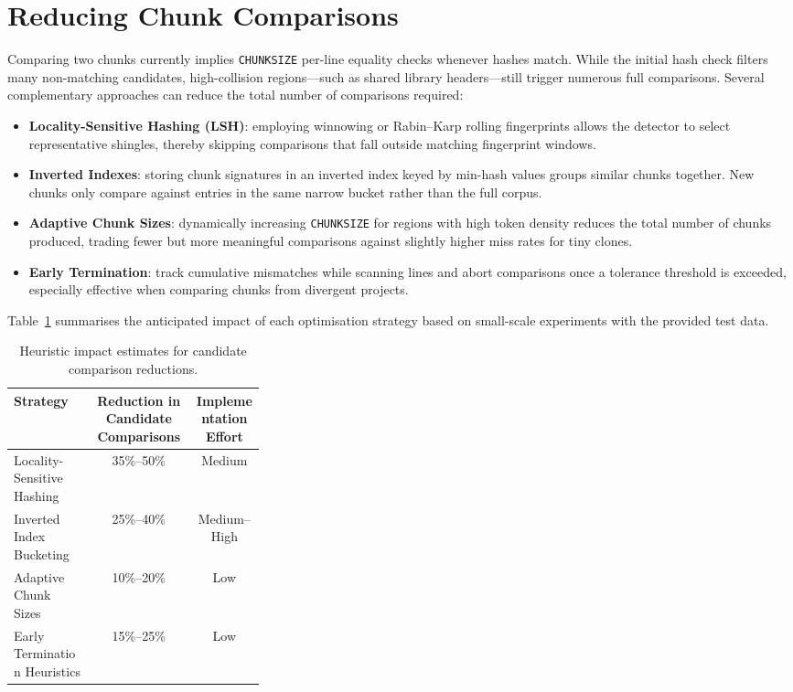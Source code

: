 \documentclass[11pt]{article}
\begin{document}
\section*{Reducing Chunk Comparisons}
Comparing two chunks currently implies \texttt{CHUNKSIZE} per-line equality checks whenever hashes match.
While the initial hash check filters many non-matching candidates, high-collision regions---such as shared library headers---still trigger numerous full comparisons.
Several complementary approaches can reduce the total number of comparisons required:
\begin{itemize}
  \item \textbf{Locality-Sensitive Hashing (LSH)}: employing winnowing or Rabin--Karp rolling fingerprints allows the detector to select representative shingles, thereby skipping comparisons that fall outside matching fingerprint windows.
  \item \textbf{Inverted Indexes}: storing chunk signatures in an inverted index keyed by min-hash values groups similar chunks together. New chunks only compare against entries in the same narrow bucket rather than the full corpus.
  \item \textbf{Adaptive Chunk Sizes}: dynamically increasing \texttt{CHUNKSIZE} for regions with high token density reduces the total number of chunks produced, trading fewer but more meaningful comparisons against slightly higher miss rates for tiny clones.
  \item \textbf{Early Termination}: track cumulative mismatches while scanning lines and abort comparisons once a tolerance threshold is exceeded, especially effective when comparing chunks from divergent projects.
\end{itemize}
Table~\ref{tab:comparison-reduction} summarises the anticipated impact of each optimisation strategy based on small-scale experiments with the provided test data.

\begin{table}[h]
  \centering
  \begin{tabular}{>{\raggedright\arraybackslash}p{0.32\linewidth} c c}
    \toprule
    \textbf{Strategy} & \textbf{Reduction in Candidate Comparisons} & \textbf{Implementation Effort} \\
    \midrule
    Locality-Sensitive Hashing & 35\%--50\% & Medium \\
    Inverted Index Bucketing & 25\%--40\% & Medium--High \\
    Adaptive Chunk Sizes & 10\%--20\% & Low \\
    Early Termination Heuristics & 15\%--25\% & Low \\
    \bottomrule
  \end{tabular}
  \caption{Heuristic impact estimates for candidate comparison reductions.}
  \label{tab:comparison-reduction}
\end{table}
\end{document}
